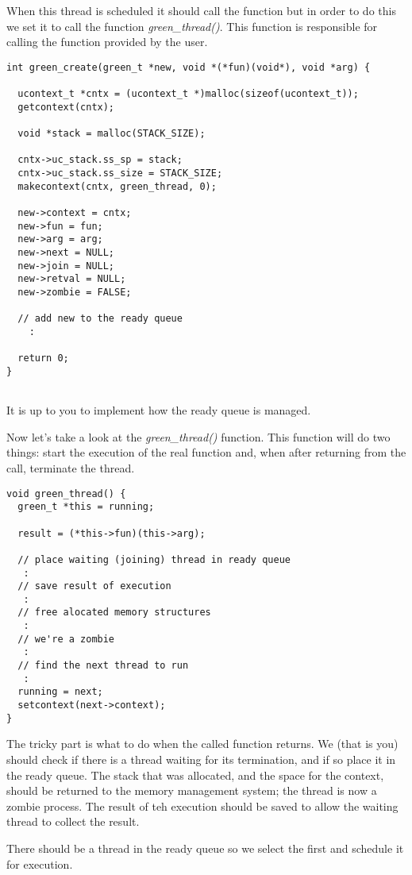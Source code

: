 \documentclass[a4paper,11pt]{article}
\begin{document}
When this thread is scheduled it should call the function but in order
to do this we set it to call the function {\em green\_thread()}. This
function is responsible for calling the function provided by the user.

\begin{lstlisting}
int green_create(green_t *new, void *(*fun)(void*), void *arg) {  

  ucontext_t *cntx = (ucontext_t *)malloc(sizeof(ucontext_t));
  getcontext(cntx);

  void *stack = malloc(STACK_SIZE);

  cntx->uc_stack.ss_sp = stack;
  cntx->uc_stack.ss_size = STACK_SIZE;
  makecontext(cntx, green_thread, 0);  

  new->context = cntx;
  new->fun = fun;
  new->arg = arg;
  new->next = NULL;
  new->join = NULL;
  new->retval = NULL;
  new->zombie = FALSE;
  
  // add new to the ready queue
    :

  return 0;
}
  
\end{lstlisting}

It is up to you to implement how the ready queue is managed. 

Now let's take a look at the {\em green\_thread()} function. This
function will do two things: start the execution of the real function
and, when after returning from the call, terminate the thread.

\begin{lstlisting}
void green_thread() {
  green_t *this = running;
  
  result = (*this->fun)(this->arg);

  // place waiting (joining) thread in ready queue
   :
  // save result of execution
   :
  // free alocated memory structures
   :
  // we're a zombie
   :
  // find the next thread to run
   :
  running = next;
  setcontext(next->context);
}
\end{lstlisting}

The tricky part is what to do when the called function returns. We
(that is you) should check if there is a thread waiting for its
termination, and if so place it in the ready queue. The stack that was
allocated, and the space for the context, should be returned to the
memory management system; the thread is now a zombie process. The
result of teh execution should be saved to allow the waiting thread to
collect the result.

There should be a thread in the ready queue so we select the
first and schedule it for execution. 
\end{document}
